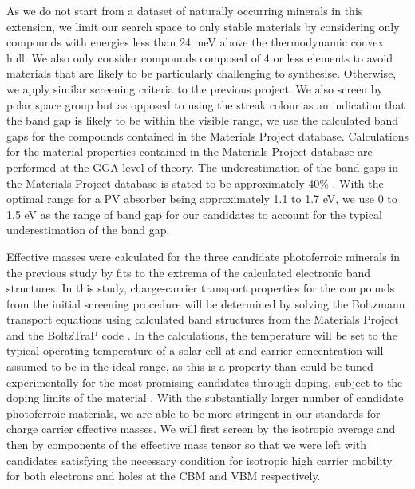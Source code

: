 \documentclass[11pt, twoside]{report}
\begin{document}
As we do not start from a dataset of naturally occurring minerals in this extension, we limit our search space to only stable materials by considering only compounds with energies less than 24 meV above the thermodynamic convex hull. We also only consider compounds composed of 4 or less elements to avoid materials that are likely to be particularly challenging to synthesise. 
Otherwise, we apply similar screening criteria to the previous project. We also screen by polar space group but as opposed to using the streak colour as an indication that the band gap is likely to be within the visible range, we use the calculated band gaps for the compounds contained in the Materials Project database. Calculations for the material properties contained in the Materials Project database are performed at the GGA level of theory.
The underestimation of the band gaps in the Materials Project database is stated to be approximately 40\% \cite{MP_bandgaps, MP_highthroughput}. With the optimal range for a PV absorber being approximately 1.1 to 1.7 eV, we use 0 to 1.5 eV as the range of band gap for our candidates to account for the typical underestimation of the band gap. 

Effective masses were calculated for the three candidate photoferroic minerals in the previous study by fits to the extrema of the calculated electronic band structures. In this study, charge-carrier transport properties for the compounds from the initial screening procedure will be determined by solving the Boltzmann transport equations using calculated band structures from the Materials Project and the BoltzTraP code \cite{Boltztrap}. In the calculations, the temperature will be set to the typical operating temperature of a solar cell at and carrier concentration will assumed to be in the ideal range, as this is a property than could be tuned experimentally for the most promising candidates through doping, subject to the doping limits of the material \cite{Zhang_doping_limits}. 
With the substantially larger number of candidate photoferroic materials, we are able to be more stringent in our standards for charge carrier effective masses. We will first screen by the isotropic average and then by components of the effective mass tensor so that we were left with candidates satisfying the necessary condition for isotropic high carrier mobility for both electrons and holes at the CBM and VBM respectively.

\end{document}
